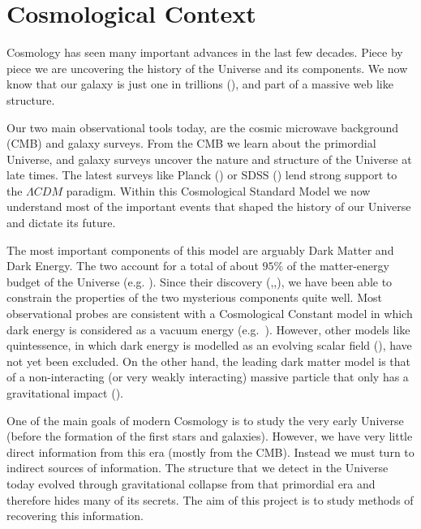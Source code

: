 
\section{Cosmological Context}

Cosmology has seen many important advances in the last few decades. Piece by piece we are uncovering the history of the Universe and its components. We now know that our galaxy is just one in trillions (\cite{2016ApJ...830...83C}), and part of a massive web like structure.

Our two main observational tools today, are the cosmic microwave background (CMB) and galaxy surveys. From the CMB we learn about the primordial Universe, and galaxy surveys uncover the nature and structure of the Universe at late times. The latest surveys like Planck (\cite{2016A&A...594A..13P}) or SDSS (\cite{PhysRevD.69.103501}) lend strong support to the $\Lambda CDM$ paradigm. Within this Cosmological Standard Model we now understand most of the important events that shaped the history of our Universe and dictate its future. 

The most important components of this model are arguably Dark Matter and Dark Energy. The two account for a total of about $95\%$ of the matter-energy budget of the Universe (e.g. \cite{2016A&A...594A..13P}). Since their discovery (\cite{Babcock_andromeda_rotation},\cite{1999ApJ...517..565P},\cite{Riess_accelerated_expansion}), we have been able to constrain the properties of the two mysterious components quite well. Most observational probes are consistent with a Cosmological Constant model in which dark energy is considered as a vacuum energy (e.g.~\cite{2016A&A...594A..13P}). However, other models like quintessence, in which dark energy is modelled as an evolving scalar field (\cite{PhysRevD.37.3406}), have not yet been excluded. On the other hand, the leading dark matter model is that of a non-interacting (or very weakly interacting) massive particle that only has a gravitational impact (\cite{BERTONE2005279}).

One of the main goals of modern Cosmology is to study the very early Universe (before the formation of the first stars and galaxies). However, we have very little direct information from this era (mostly from the CMB). Instead we must turn to indirect sources of information. The structure that we detect in the Universe today evolved through gravitational collapse from that primordial era and therefore hides many of its secrets. The aim of this project is to study methods of recovering this information. 

